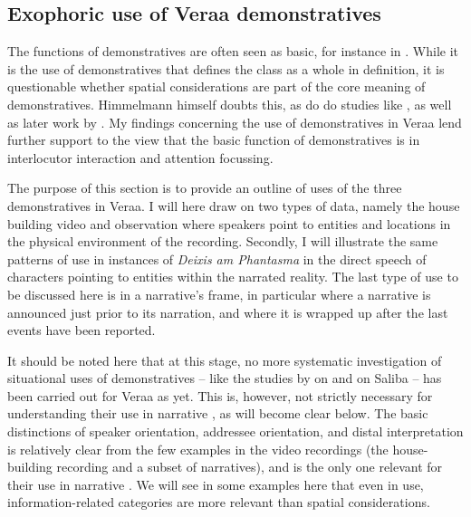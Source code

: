 \documentclass[output=paper
,modfonts
,nonflat]{langsci/langscibook}
\begin{document}
\subsection{Exophoric use of Vera{\textquotesingle}a demonstratives}	\label{demvraexouse}
The  functions of demonstratives are often seen as basic, for instance in \cite{Diessel1999}. While it is the  use of demonstratives that defines the class as a whole in  definition, it is questionable whether spatial considerations are part of the core meaning of demonstratives. Himmelmann himself doubts this, as do do studies like \cite{Enfield2003}, as well as later work by \cite{Diessel2006}. My findings concerning the use of demonstratives in Vera{\textquotesingle}a lend further support to the view that the basic function of demonstratives is in interlocutor interaction and attention focussing.\largerpage[-1]

The purpose of this section is to provide an outline of  uses of the three demonstratives in Vera{\textquotesingle}a. I will here draw on two types of data, namely the house building video and observation where speakers point to entities and locations in the physical environment of the recording. Secondly, I will illustrate the same patterns of  use in instances of \textit{Deixis am Phantasma} in the direct speech of characters pointing to entities within the narrated reality. The last type of  use to be discussed here is in a narrative's frame, in particular where a narrative is announced just prior to its narration, and where it is wrapped up after the last events have been reported.

It should be noted here that at this stage, no more systematic investigation of situational uses of demonstratives -- like the studies by \cite{Enfield2003} on  and \cite{Margetts2004} on Saliba -- has been carried out for Vera{\textquotesingle}a as yet. This is, however, not strictly necessary for understanding their use in narrative , as will become clear below. The basic distinctions of speaker orientation, addressee orientation, and distal interpretation is relatively clear from the few examples in the video recordings (the house-building recording and a subset of narratives), and is the only one relevant for their use in narrative . We will see in some examples here that even in  use, information-related categories are more relevant than spatial considerations.
\end{document}
